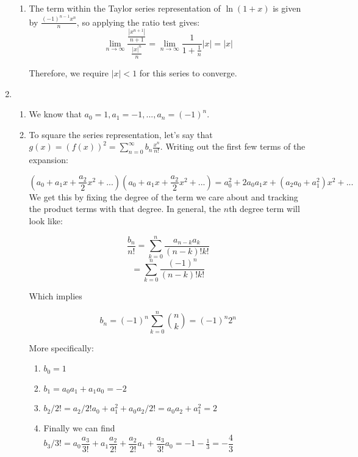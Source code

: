 \begin{enumerate}
\begin{enumerate}
                \item The term within the Taylor series representation of $\ln(1+x)$ is given by $\frac{(-1)^{n-1}x^n}{n}$, so applying the ratio test gives:
                \[\lim_{n\to\infty}\frac{\frac{|x^{n+1}|}{n+1}}{\frac{|x|^n}{n}} = \lim_{n\to\infty}\frac{1}{1+\frac{1}{n}}|x| = |x|\]
                
                Therefore, we require $|x| < 1$ for this series to converge.
            \end{enumerate}
            
            \item 
            \begin{enumerate}
                \item We know that $a_0 = 1, a_1 = -1, ..., a_n = (-1)^n$.
                
                
                \item To square the series representation, let's say that $g(x) = (f(x))^2=\sum_{n=0}^\infty b_n \frac{x^n}{n!}$. Writing out the first few terms of the expansion:

                \[(a_0 + a_1x + \frac{a_2}{2}x^2 +...)(a_0 + a_1x + \frac{a_2}{2}x^2 +...) = a_0^2 + 2a_0a_1x + (a_2a_0 +a_1^2)x^2 + ...\]
                We get this by fixing the degree of the term we care about and tracking the product terms with that degree. 
                In general, the $n$th degree term will look like:

                \[\frac{b_n}{n!} = \sum_{k=0}^n \frac{a_{n-k}a_k}{(n-k)!k!}\]
                \[ = \sum_{k=0}^n \frac{(-1)^n}{(n-k)!k!}\]

                Which implies

                \[b_n = (-1)^n\sum_{k=0}^n {n \choose k} = (-1)^n 2^n\]
                
                More specifically:

                \begin{enumerate}
                    \item $b_0 = 1$
                    \item $b_1 = a_0a_1 + a_1 a_0 = -2$
                    \item $b_2/2! = a_2/2!a_0 + a_1^2 + a_0a_2/2! = a_0a_2 + a_1^2 = 2$
                    \item Finally we can find $b_3/3! = a_0\dfrac{a_3}{3!} + a_1 \dfrac{a_2}{2!} + \dfrac{a_2}{2!}a_1 + \dfrac{a_3}{3!}a_0 = -1-\frac{1}{3} = -\dfrac{4}{3}$


\end{enumerate}
\end{enumerate}
\end{enumerate}

